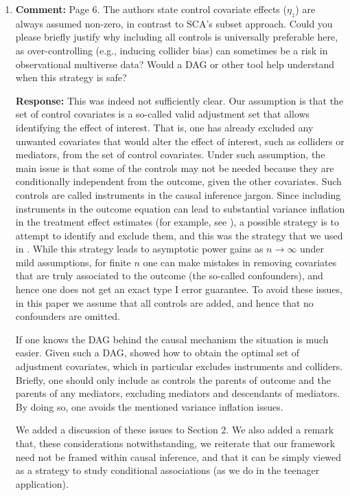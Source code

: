 \documentclass[11pt, a4paper]{article}
\newcommand{\reply}{\vspace{0.3cm} \noindent \textbf{Response:} {\it }}
\begin{document}
\begin{enumerate}[leftmargin=*]
    \vspace{0.5cm}

    \item \textbf{Comment:} Page 6. The authors state control covariate effects ($\eta_z$) are always assumed non-zero, in contrast to SCA's subset approach. Could you please briefly justify why including all controls is universally preferable here, as over-controlling (e.g., inducing collider bias) can sometimes be a risk in observational multiverse data? Would a DAG or other tool help understand when this strategy is safe?

    \reply This was indeed not sufficiently clear. Our assumption is that the set of control covariates is a so-called valid adjustment set\citep{henckel:2022} that allows identifying the effect of interest. 
That is, one has already excluded any unwanted covariates that would alter the effect of interest, such as colliders or mediators, from the set of control covariates.
Under such assumption, the main issue is that some of the controls may not be needed because they are conditionally independent from the outcome, given the other covariates. Such controls are called instruments in the causal inference jargon.
Since including instruments in the outcome equation can lead to substantial variance inflation in the treatment effect estimates (for example, see \cite{papaspiliopoulos:2026}), a possible strategy is to attempt to identify and exclude them, and this was the strategy that we used in \cite{semken:2022}.
While this strategy leads to asymptotic power gains as $n \to \infty$ under mild assumptions, for finite $n$ one can make mistakes in removing covariates that are truly associated to the outcome (the so-called confounders), and hence one does not get an exact type I error guarantee. To avoid these issues, in this paper we assume that all controls are added, and hence that no confounders are omitted.

If one knows the DAG behind the causal mechanism the situation is much easier. Given such a DAG, \cite{henckel:2022} showed how to obtain the optimal set of adjustment covariates, which in particular excludes instruments and colliders. 
Briefly, one should only include as controls the parents of outcome and the parents of any mediators, excluding mediators and descendants of mediators.
By doing so, one avoids the mentioned variance inflation issues.

We added a discussion of these issues to Section 2. We also added a remark that, these considerations notwithstanding, we reiterate that our framework need not be framed within causal inference, and that it can be simply viewed as a strategy to study conditional associations (as we do in the teenager application).



\end{enumerate}
\end{document}
